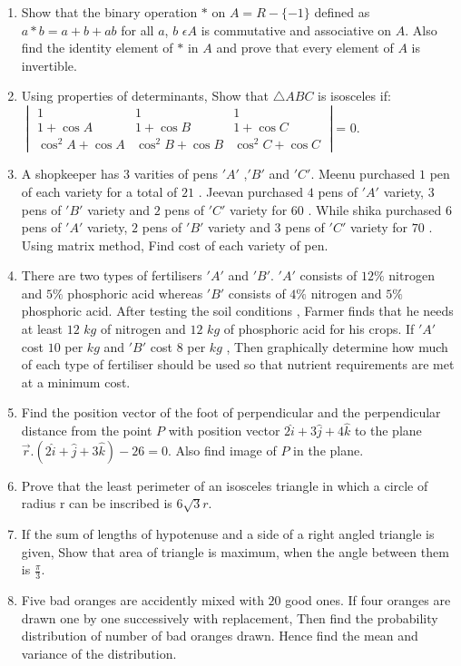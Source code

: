 \documentclass{article}
\begin{document}
\begin{enumerate}
 \item Show that the binary operation $*$ on  $A=R-\{-1\}$ defined as $a*b =a+b+ab$ for all $a$, $b$ $\epsilon A$ is commutative and associative on $A$. Also find the identity element of $*$ in $A$ and prove that every element of $A$ is invertible.
 \item Using properties of determinants, Show that $\triangle ABC$ is isosceles if: \\
$\begin{vmatrix}1 & 1 & 1 \\1 + \cos A & 1 + \cos B & 1 + \cos C \\\cos^2 A + \cos A & \cos^2 B + \cos B & \cos^2 C + \cos C
\end{vmatrix}$= $0$.
 \item A shopkeeper has $3$ varities of pens $'A'$ ,$'B'$ and $'C'$. Meenu purchased $1$ pen of each variety for a total of \rupee $21$ . Jeevan purchased $4$ pens of $'A'$ variety, $3$ pens of $'B'$ variety and $2$ pens of $'C'$ variety for \rupee $60$ . While shika purchased $6$ pens of $'A'$ variety, $2$ pens of $'B'$ variety and $3$ pens of $'C'$ variety for \rupee $70$ . Using matrix method, Find cost of each variety of pen.
 \item There are two types of fertilisers $'A'$ and $'B'$. $'A'$ consists of $12\%$ nitrogen and $5\%$ phosphoric acid whereas $'B'$ consists of $4\%$ nitrogen and $5\%$ phosphoric acid. After testing the  soil conditions , Farmer finds that he needs at least $12$ $kg$ of nitrogen and $12$ $kg$ of phosphoric acid for his crops. If $'A'$ cost \rupee $10$ per $kg$ and $'B'$ cost \rupee $8$ per $kg$ , Then graphically determine how much of each type of fertiliser should be used so that nutrient requirements are met at a minimum cost.  
\item Find the position vector of the foot of perpendicular and the perpendicular distance from the point $P$ with position vector $ 2\hat{i}+3\hat{j}+4\hat{k} $ to the plane $\overrightarrow{r}.(2\hat{i}+\hat{j}+3\hat{k})-26 =0$. Also find image of $P$ in the plane.
 \item Prove that the least perimeter of an isosceles triangle in which a circle of radius r can be inscribed is $6\sqrt{3}r$.
 \item If the sum of lengths of hypotenuse and a side of a right angled triangle is given, Show that area of triangle is maximum, when the angle between them is $\frac{\pi}{3}$.
 \item Five bad oranges are accidently mixed with $20$ good ones. If four oranges are drawn one by one successively with replacement, Then find the probability distribution of number of bad oranges drawn. Hence find the mean and variance of the distribution.
\end{enumerate}
\end{document}

